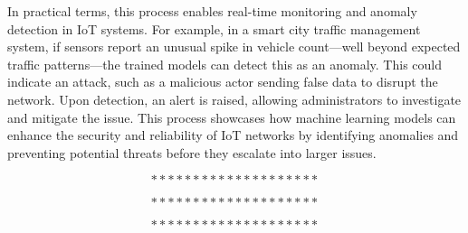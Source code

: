 In practical terms, this process enables real-time monitoring and anomaly detection in IoT systems. For example, in a smart city traffic management system, if sensors report an unusual spike in vehicle count—well beyond expected traffic patterns—the trained models can detect this as an anomaly. This could indicate an attack, such as a malicious actor sending false data to disrupt the network. Upon detection, an alert is raised, allowing administrators to investigate and mitigate the issue. This process showcases how machine learning models can enhance the security and reliability of IoT networks by identifying anomalies and preventing potential threats before they escalate into larger issues\cite{85}.

$$********************$$



$$********************$$



$$********************$$